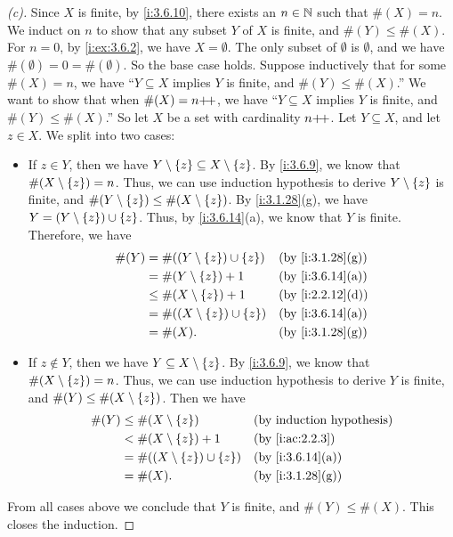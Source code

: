 \begin{proof}[(c)]
  Since \(X\) is finite, by \cref{i:3.6.10}, there exists an \(n \in \mathbb{N}\) such that \(\#(X) = n\).
  We induct on \(n\) to show that any subset \(Y\) of \(X\) is finite, and \(\#(Y) \leq \#(X)\).
  For \(n = 0\), by \cref{i:ex:3.6.2}, we have \(X = \emptyset\).
  The only subset of \(\emptyset\) is \(\emptyset\), and we have \(\#(\emptyset) = 0 = \#(\emptyset)\).
  So the base case holds.
  Suppose inductively that for some \(\#(X) = n\), we have ``\(Y \subseteq X\) implies \(Y\) is finite, and \(\#(Y) \leq \#(X)\).''
  We want to show that when \(\#(X) = n{+}\!{+}\), we have ``\(Y \subseteq X\) implies \(Y\) is finite, and \(\#(Y) \leq \#(X)\).''
  So let \(X\) be a set with cardinality \(n{+}\!{+}\).
  Let \(Y \subseteq X\), and let \(z \in X\).
  We split into two cases:
  \begin{itemize}
    \item If \(z \in Y\), then we have \(Y \setminus \left\lbrace z\right\rbrace \subseteq X \setminus \left\lbrace z\right\rbrace\).
          By \cref{i:3.6.9}, we know that \(\#(X \setminus \left\lbrace z\right\rbrace) = n\).
          Thus, we can use induction hypothesis to derive \(Y \setminus \left\lbrace z\right\rbrace\) is finite, and \(\#(Y \setminus \left\lbrace z\right\rbrace) \leq \#(X \setminus \left\lbrace z\right\rbrace)\).
          By \cref{i:3.1.28}(g), we have \(Y = (Y \setminus \left\lbrace z\right\rbrace) \cup \left\lbrace z\right\rbrace\).
          Thus, by \cref{i:3.6.14}(a), we know that \(Y\) is finite.
          Therefore, we have
          \begin{align*}
            \#(Y) & = \#((Y \setminus \set{z}) \cup \set{z}) &  & \by{i:3.1.28}[g] \\
                  & = \#(Y \setminus \set{z}) + 1            &  & \by{i:3.6.14}[a] \\
                  & \leq \#(X \setminus \set{z}) + 1         &  & \by{i:2.2.12}[d] \\
                  & = \#((X \setminus \set{z}) \cup \set{z}) &  & \by{i:3.6.14}[a] \\
                  & = \#(X).                                 &  & \by{i:3.1.28}[g]
          \end{align*}
    \item If \(z \notin Y\), then we have \(Y \subseteq X \setminus \left\lbrace z\right\rbrace\).
          By \cref{i:3.6.9}, we know that \(\#(X \setminus \left\lbrace z\right\rbrace) = n\).
          Thus, we can use induction hypothesis to derive \(Y\) is finite, and \(\#(Y) \leq \#(X \setminus \left\lbrace z\right\rbrace)\).
          Then we have
          \begin{align*}
            \#(Y) & \leq \#(X \setminus \set{z})             &  & \byIH            \\
                  & < \#(X \setminus \set{z}) + 1            &  & \by{i:ac:2.2.3}  \\
                  & = \#((X \setminus \set{z}) \cup \set{z}) &  & \by{i:3.6.14}[a] \\
                  & = \#(X).                                 &  & \by{i:3.1.28}[g]
          \end{align*}
  \end{itemize}
  From all cases above we conclude that \(Y\) is finite, and \(\#(Y) \leq \#(X)\).
  This closes the induction.


\end{proof}
